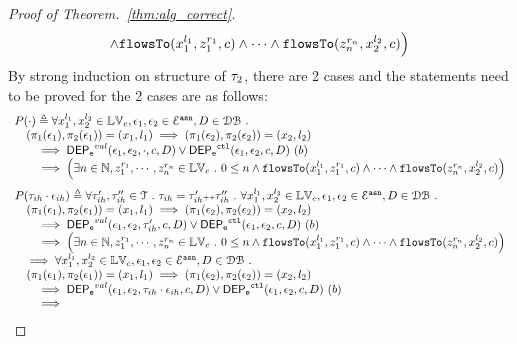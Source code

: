 \begin{proof}[Proof of Theorem.~\ref{thm:alg_correct}]
\[\begin{array}{l}
 \land \mathtt{flowsTo}(x_1^{l_1}, z_1^{r_1}, c) \land \cdots \land \mathtt{flowsTo}(z_n^{r_n}, {x}_2^{l_2}, c) \Big)
\end{array}
\]
%
%
By strong induction on structure of $\vtrace_2$, there are 2 cases and the statements need to be proved for the 2 cases are as follows:
%
$$
\begin{array}{l}
P(\cdot)
 \triangleq
\forall {x}_1^{l_1}, {x}_2^{l_2} \in \lvar_{{c}},
\event_1, \event_2 \in \eventset^{\asn}, D \in \dbdom \st
\\ \quad
(\pi_{1}{(\event_1)}, \pi_{2}{(\event_1)}) = ({x}_1, l_1)
\implies
(\pi_{1}{(\event_2)}, \pi_{2}{(\event_2)}) = ({x}_2, l_2)
 \\ \qquad \implies 
\eventdep^{val}(\event_1, \event_2, \cdot, c, D)
\lor
\eventdep^{\ctl}(\event_1, \event_2, c, D)  ~ (b)
  \\ \qquad \implies
   \Big(\exists  n \in \mathbb{N}, z_1^{r_1}, \cdots, z_n^{r_n} \in \lvar_{{c}} \st 0 \leq n
 \land \flowsto(x_1^{l_1}, z_1^{r_1}, c) \land \cdots \land \flowsto(z_n^{r_n}, {x}_2^{l_2}, c) \Big)
\end{array}
$$
%
$$
\begin{array}{l}
P(\trace_{ih} \cdot \event_{ih})
\triangleq 
\forall \trace_{ih}', \trace_{ih}'' \in \mathcal{T} \st \trace_{ih} = \trace_{ih}' \tracecat \trace_{ih}'' \st
\forall {x}_1^{l_1}, {x}_2^{l_2} \in \lvar_{{c}},
\event_1, \event_2 \in \eventset^{\asn}, D \in \dbdom \st
\\ \quad
(\pi_{1}{(\event_1)}, \pi_{2}{(\event_1)}) = ({x}_1, l_1)
\implies
(\pi_{1}{(\event_2)}, \pi_{2}{(\event_2)}) = ({x}_2, l_2)
 \\ \qquad \implies 
\eventdep^{val}(\event_1, \event_2, \trace_{ih}', c, D)
\lor
\eventdep^{\ctl}(\event_1, \event_2, c, D)  ~ (b)
  \\ \qquad \implies
   \Big(\exists  n \in \mathbb{N}, z_1^{r_1}, \cdots, z_n^{r_n} \in \lvar_{{c}} \st 0 \leq n
 \land \flowsto(x_1^{l_1}, z_1^{r_1}, c) \land \cdots \land \flowsto(z_n^{r_n}, {x}_2^{l_2}, c) \Big)
\\ \quad \implies
\forall {x}_1^{l_1}, {x}_2^{l_2} \in \lvar_{{c}},
\event_1, \event_2 \in \eventset^{\asn}, D \in \dbdom \st
\\ \quad
(\pi_{1}{(\event_1)}, \pi_{2}{(\event_1)}) = ({x}_1, l_1)
\implies
(\pi_{1}{(\event_2)}, \pi_{2}{(\event_2)}) = ({x}_2, l_2)
 \\ \qquad \implies 
\eventdep^{val}(\event_1, \event_2, \trace_{ih} \cdot \event_{ih}, c, D)
\lor
\eventdep^{\ctl}(\event_1, \event_2, c, D)  ~ (b)
  \\ \qquad \implies

\end{array}$$
\end{proof}
